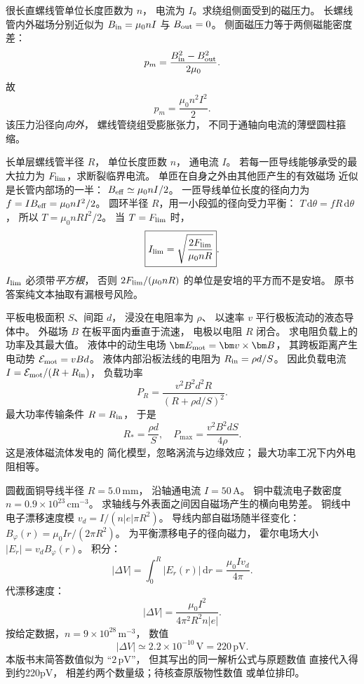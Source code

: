 很长直螺线管单位长度匝数为 $n$，
电流为 $I$。求绕组侧面受到的磁压力。
\exsolution
长螺线管内外磁场分别近似为
$B_{\rm in}=\mu_0nI$ 与 $B_{\rm out}=0$。
侧面磁压力等于两侧磁能密度差：
\[
p_m=\frac{B_{\rm in}^2-B_{\rm out}^2}{2\mu_0}.
\]
故
\[
\boxed{p_m=\frac{\mu_0n^2I^2}{2}}.
\]
\excheck 该压力沿径向\emph{向外}，
螺线管绕组受膨胀张力，
不同于通轴向电流的薄壁圆柱箍缩。

长单层螺线管半径 $R$，
单位长度匝数 $n$，
通电流 $I$。
若每一匝导线能够承受的最大拉力为
$F_{\rm lim}$，求断裂临界电流。
\exsolution
单匝在自身之外由其他匝产生的有效磁场
近似是长管内部场的一半：
$B_{\rm eff}\simeq\mu_0nI/2$。
一匝导线单位长度的径向力为
$f=IB_{\rm eff}=\mu_0nI^2/2$。
圆环半径 $R$，用一小段弧的径向受力平衡：
$T\,\mathrm d\theta=fR\,\mathrm d\theta$，
所以
$T=\mu_0nRI^2/2$。
当 $T=F_{\rm lim}$ 时，
\[
\boxed{I_{\rm lim}=
\sqrt{\frac{2F_{\rm lim}}{\mu_0nR}}}.
\]
\excheck $I_{\rm lim}$ 必须带\emph{平方根}，
否则 $2F_{\rm lim}/(\mu_0nR)$
的单位是安培的平方而不是安培。
原书答案纯文本抽取有漏根号风险。

平板电极面积 $S$、间距 $d$，
浸没在电阻率为 $\rho$、
以速率 $v$ 平行极板流动的液态导体中。
外磁场 $B$ 在板平面内垂直于流速，
电极以电阻 $R$ 闭合。
求电阻负载上的功率及其最大值。
\exsolution
液体中的动生电场
$\bm E_{\rm mot}=\bm v\times\bm B$，
其跨板距离产生电动势
$\mathcal E_{\rm mot}=vBd$。
液体内部沿板法线的电阻为
$R_{\rm in}=\rho d/S$。
因此负载电流
$I=\mathcal E_{\rm mot}/(R+R_{\rm in})$，
负载功率
\[
\boxed{P_R=
\frac{v^2B^2d^2 R}{(R+\rho d/S)^2}}.
\]
最大功率传输条件
$R=R_{\rm in}$，
于是
\[
\boxed{R_*=\frac{\rho d}{S}},
\quad
\boxed{P_{\max}=
\frac{v^2B^2dS}{4\rho}}.
\]
\excheck 这是液体磁流体发电的
简化模型，忽略涡流与边缘效应；
最大功率工况下内外电阻相等。

圆截面铜导线半径
$R=5.0\,\mathrm{mm}$，
沿轴通电流 $I=50\,\mathrm A$。
铜中载流电子数密度
$n=0.9\times10^{23}\,\mathrm{cm^{-3}}$。
求轴线与外表面之间因自磁场产生的横向电势差。
\exsolution
铜线中电子漂移速度模
$v_d=I/(n|e|\pi R^2)$。
导线内部自磁场随半径变化：
$B_\varphi(r)=\mu_0Ir/(2\pi R^2)$。
为平衡漂移电子的径向磁力，
霍尔电场大小
$|E_r|=v_d B_\varphi(r)$。
积分：
\[
|\Delta V|=\int_0^R|E_r(r)|\,\mathrm dr
=\frac{\mu_0Iv_d}{4\pi}.
\]
代漂移速度：
\[
\boxed{|\Delta V|=
\frac{\mu_0I^2}{4\pi^2R^2n|e|}}.
\]
按给定数据，$n=9\times10^{28}\,\mathrm{m^{-3}}$，
数值
\[
\boxed{|\Delta V|\simeq2.2\times10^{-10}\,\mathrm V
=220\,\mathrm{pV}}.
\]
\excheck 本版书末简答数值似为
“$2\,\mathrm{pV}$”，
但其写出的同一解析公式与原题数值
直接代入得到约220pV，
相差约两个数量级；待核查原版物性数值
或单位排印。


